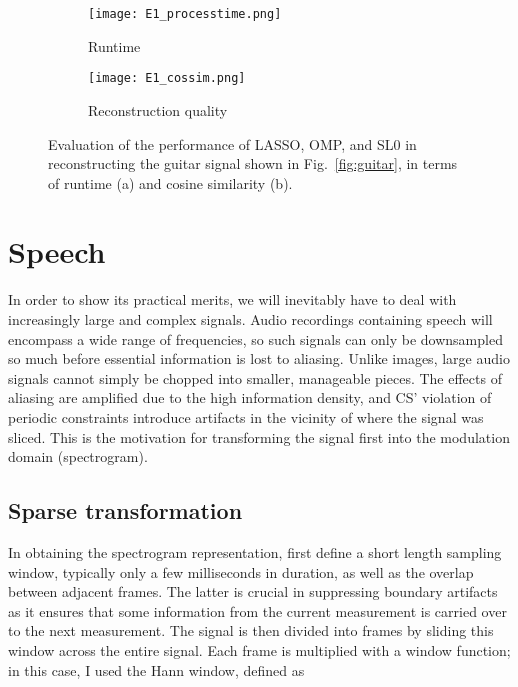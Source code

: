 \begin{figure}[htb]
	\centering
	\begin{subfigure}{0.49\textwidth}
		\centering
		\texttt{[image: E1\_processtime.png]}
		\caption{Runtime}
		\label{fig:guitar-runtime}
	\end{subfigure}
	\begin{subfigure}{0.49\textwidth}
		\centering
		\texttt{[image: E1\_cossim.png]}
		\caption{Reconstruction quality}
		\label{fig:guitar-cossim}
	\end{subfigure}
	\caption{Evaluation of the performance of LASSO, OMP, and SL0 in reconstructing the guitar signal shown in Fig.~\ref{fig:guitar}, in terms of runtime (a) and cosine similarity (b).}
	\label{fig:guitar-algorithms}
\end{figure}


\section{Speech}
\label{sec:audio-speech}
In order to show its practical merits, we will inevitably have to deal with increasingly large and complex signals. Audio recordings containing speech will encompass a wide range of frequencies, so such signals can only be downsampled so much before essential information is lost to aliasing. Unlike images, large audio signals cannot simply be chopped into smaller, manageable pieces. The effects of aliasing are amplified due to the high information density, and CS' violation of periodic constraints introduce artifacts in the vicinity of where the signal was sliced. This is the motivation for transforming the signal first into the modulation domain (spectrogram).

\subsection{Sparse transformation}
\label{ssec:audio-speech-sparse}
In obtaining the spectrogram representation, first define a short length sampling window, typically only a few milliseconds in duration, as well as the overlap between adjacent frames. The latter is crucial in suppressing boundary artifacts as it ensures that some information from the current measurement is carried over to the next measurement. The signal is then divided into frames by sliding this window across the entire signal. Each frame is multiplied with a window function; in this case, I used the Hann window, defined as

